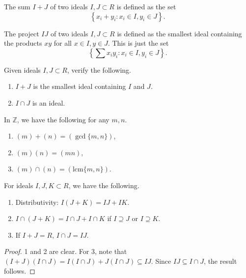 \begin{definition}
The sum $I + J$ of two ideals $I, J \subset R$ is defined as the set
  \[ \left\{ x_i + y_i : x_i \in I, y_i \in J \right\}. \]
\end{definition}

\begin{definition}
The project $IJ$ of two ideals $I, J \subset R$ is defined as the smallest
ideal containing the products $xy$ for all $x \in I, y \in J$. This is just
the set
  \[ \left\{ \sum x_i y_i : x_i \in I, y_i \in J \right\}. \]
\end{definition}

\begin{exercise}
Given ideals $I, J \subset R$, verify the following.

\begin{enumerate}
  \item $I + J$ is the smallest ideal containing $I$ and $J$.
  \item $I \cap J$ is an ideal.
\end{enumerate}
\end{exercise}

\begin{example}
In $\mathbb{Z}$, we have the following for any $m, n$.

\begin{enumerate}
  \item $(m) + (n) = (\gcd\{ m, n \})$,
  \item $(m)(n) = (mn)$,
  \item $(m) \cap (n) = (\mathrm{lcm}\{ m, n \})$.
\end{enumerate}
\end{example}

\begin{proposition}
For ideals $I, J, K \subset R$, we have the following.

\begin{enumerate}
  \item Distributivity: $I(J + K) = IJ + IK$.
  \item $I \cap (J + K) = I \cap J + I \cap K$ if $I \supseteq J$ or $I \supseteq K$.
  \item If $I + J = R$, $I \cap J = IJ$.
\end{enumerate}

\begin{proof}
1 and 2 are clear.  For 3, note that $(I + J)(I \cap J) = I(I \cap J)
+ J(I \cap J) \subseteq IJ$.  Since $IJ \subseteq I \cap J$, the result
follows.
\end{proof}
\end{proposition}

